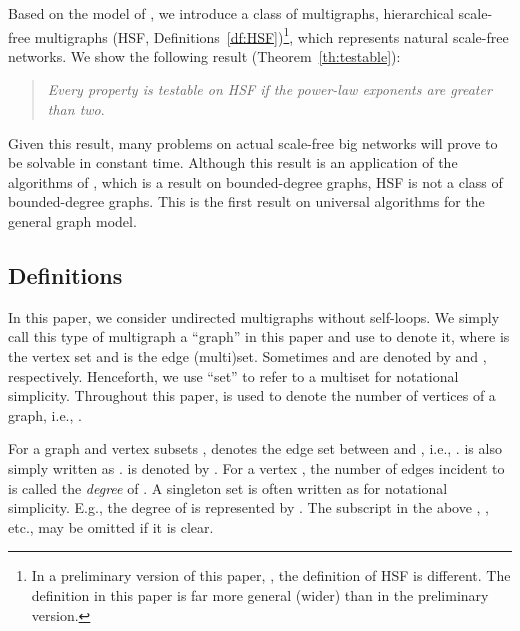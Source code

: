 \documentclass[11pt]{article}
\begin{document}
Based on the model of \cite{Uno-Watanabe_ScaleFree}, we introduce a class of multigraphs, 
hierarchical scale-free multigraphs (HSF, Definitions~\ref{df:HSF})\footnote{
In a preliminary version of this paper, \cite{ScalefreeTest_itohiro15_arXiv}, 
the definition of HSF is different.  
The definition in this paper is far more general (wider) than in the preliminary version. 
}, 
which represents natural scale-free networks. 
We show the following result (Theorem~\ref{th:testable}): 

\begin{quote}
{\em Every property is testable on HSF if the power-law exponents are greater than two}.  
\end{quote}

Given this result, many problems on actual scale-free big networks will prove to be solvable in constant time. 
Although this result is an application of the algorithms of \cite{NS_Testable_SJCOMP13},  
which is a result on bounded-degree graphs, 
HSF is not a class of bounded-degree graphs. 
This is the first result on universal algorithms for the general graph model. 




 













\subsection{Definitions}

In this paper, we consider undirected multigraphs without self-loops.  
We simply call this type of multigraph a ``graph'' in this paper 
and use  to denote it, 
where  is the vertex set and  is the edge (multi)set. 
Sometimes  and  are denoted by  and , respectively. 
Henceforth, we use ``set'' to refer to a multiset for notational simplicity. 
Throughout this paper,  is used to denote the number of vertices of 
a graph, i.e., . 





For a graph  and vertex subsets , 
  denotes the edge set between  and , i.e., 
 . 
  is also simply written as . 
 is denoted by . 
For a vertex , the number of edges incident to  is called the {\em degree} of .  
A singleton set  is often written as  for notational simplicity. 
E.g., the degree of  is represented by .   
The subscript  in the above , , etc., 
may be omitted if it is clear. 
\end{document}
